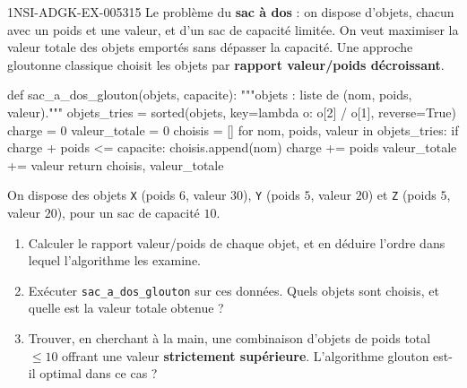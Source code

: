 \begin{exercice}{1NSI-ADGK-EX-005}{3}{15}
Le problème du \textbf{sac à dos} : on dispose d'objets, chacun avec un poids et une
valeur, et d'un sac de capacité limitée. On veut maximiser la valeur totale des objets
emportés sans dépasser la capacité. Une approche gloutonne classique choisit les objets par
\textbf{rapport valeur/poids décroissant}.
\begin{python}
def sac_a_dos_glouton(objets, capacite):
    """objets : liste de (nom, poids, valeur)."""
    objets_tries = sorted(objets, key=lambda o: o[2] / o[1], reverse=True)
    charge = 0
    valeur_totale = 0
    choisis = []
    for nom, poids, valeur in objets_tries:
        if charge + poids <= capacite:
            choisis.append(nom)
            charge += poids
            valeur_totale += valeur
    return choisis, valeur_totale
\end{python}
On dispose des objets \lstinline{X} (poids $6$, valeur $30$), \lstinline{Y} (poids $5$,
valeur $20$) et \lstinline{Z} (poids $5$, valeur $20$), pour un sac de capacité $10$.
\begin{enumerate}
  \item Calculer le rapport valeur/poids de chaque objet, et en déduire l'ordre dans lequel l'algorithme les examine.
  \item Exécuter \lstinline{sac_a_dos_glouton} sur ces données. Quels objets sont choisis, et quelle est la valeur totale obtenue ?
  \item Trouver, en cherchant à la main, une combinaison d'objets de poids total $\leqslant10$ offrant une valeur \textbf{strictement supérieure}. L'algorithme glouton est-il optimal dans ce cas ?
\end{enumerate}
\end{exercice}
